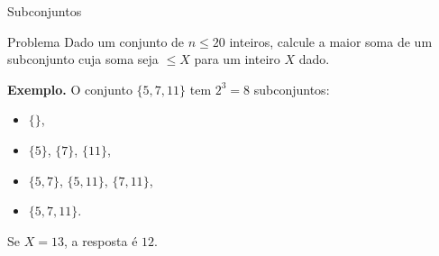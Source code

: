 \begin{frame}{Subconjuntos}

    \begin{block}{Problema}
        Dado um conjunto de $n \leq 20$ inteiros, calcule a maior soma de um subconjunto cuja soma seja $\leq X$ para um inteiro $X$ dado.
    \end{block} \pause
    
    {\bf Exemplo.} O conjunto $\{5, 7, 11\}$ tem $2^3 = 8$ subconjuntos: \pause
    \begin{itemize}
        \item $\{\}$, \pause
        \item $\{5\}$, $\{7\}$, $\{11\}$, \pause
        \item $\{5, 7\}$, $\{5, 11\}$, $\{7, 11\}$, \pause
        \item $\{5, 7, 11\}$. \pause
    \end{itemize}
    Se $X = 13$, a resposta é $12$. \pause 

\end{frame}

